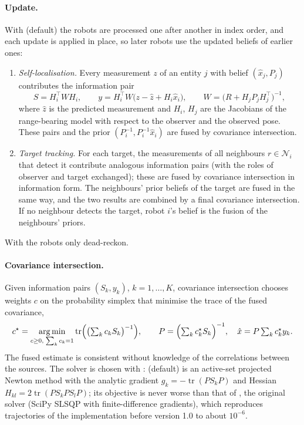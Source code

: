 \paragraph{Update.} With  (default) the robots are
processed one after another in index order, and each update is applied in place,
so later robots use the updated beliefs of earlier ones:
\begin{enumerate}
  \item \emph{Self-localisation.} Every measurement $z$ of an entity $j$ with
        belief $(\hat x_j, P_j)$ contributes the information pair
        \begin{equation*}
          S = H_i^\top W H_i, \qquad
          y = H_i^\top W \bigl(z - \hat z + H_i \hat x_i\bigr), \qquad
          W = \bigl(R + H_j P_j H_j^\top\bigr)^{-1},
        \end{equation*}
        where $\hat z$ is the predicted measurement and $H_i$, $H_j$ are the
        Jacobians of the range-bearing model with respect to the observer and
        the observed pose. These pairs and the prior
        $(P_i^{-1}, P_i^{-1}\hat x_i)$ are fused by covariance intersection.
  \item \emph{Target tracking.} For each target, the measurements of all
        neighbours $r \in \mathcal{N}_i$ that detect it contribute analogous
        information pairs (with the roles of observer and target exchanged);
        these are fused by covariance intersection in information form. The
        neighbours' prior beliefs of the target are fused in the same way, and
        the two results are combined by a final covariance intersection. If no
        neighbour detects the target, robot $i$'s belief is the fusion of the
        neighbours' priors.
\end{enumerate}
With  the robots only dead-reckon.

\paragraph{Covariance intersection.} Given information pairs
$(S_k, y_k)$, $k = 1, \dots, K$, covariance intersection chooses weights $c$ on
the probability simplex that minimise the trace of the fused covariance,
\begin{equation}
  c^\star = \operatorname*{arg\,min}_{c \ge 0,\; \sum_k c_k = 1}
    \operatorname{tr}\Bigl(\bigl(\textstyle\sum_k c_k S_k\bigr)^{-1}\Bigr),
  \qquad
  P = \Bigl(\sum_k c^\star_k S_k\Bigr)^{-1},\quad
  \hat x = P \sum_k c^\star_k y_k .
\end{equation}
The fused estimate is consistent without knowledge of the correlations between
the sources. The solver is chosen with :
 (default) is an active-set projected Newton method with the
analytic gradient $g_k = -\operatorname{tr}(P S_k P)$ and Hessian
$H_{kl} = 2 \operatorname{tr}(P S_k P S_l P)$; its objective is never worse than
that of , the original solver (SciPy SLSQP with finite-difference
gradients), which reproduces trajectories of the implementation before
version 1.0 to about $10^{-6}$.

